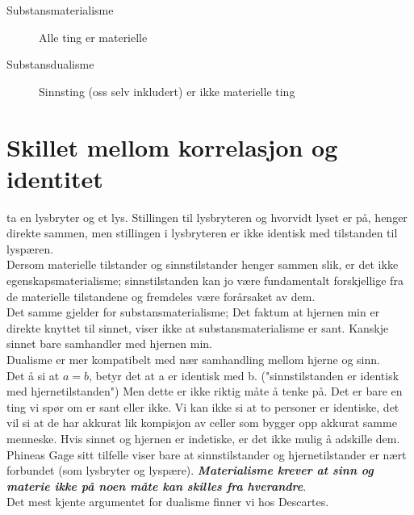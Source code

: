 \documentclass[11pt, a4paper]{article}
\begin{document}
\begin{description}
    \item[Substansmaterialisme] Alle ting er materielle
\end{description}

\begin{description}
    \item[Substansdualisme] Sinnsting (oss selv inkludert) er ikke materielle ting 
\end{description}


\section{Skillet mellom korrelasjon og identitet}

ta en lysbryter og et lys. Stillingen til lysbryteren og hvorvidt lyset er på, henger direkte sammen, men stillingen i lysbryteren er ikke identisk med tilstanden til lyspæren.\\

Dersom materielle tilstander og sinnstilstander henger sammen slik, er det ikke egenskapsmaterialisme; sinnstilstanden kan jo være fundamentalt forskjellige fra de materielle tilstandene og fremdeles være forårsaket av dem. \\

Det samme gjelder for substansmaterialisme; Det faktum at hjernen min er direkte knyttet til sinnet, viser ikke at substansmaterialisme er sant. Kanskje sinnet bare samhandler med hjernen min.\\

Dualisme er mer kompatibelt med nær samhandling mellom hjerne og sinn.\\

Det å si at $ a=b $, betyr det at a er identisk med b. ("sinnstilstanden er identisk med hjernetilstanden") Men dette er ikke riktig måte å tenke på. Det er bare en ting vi spør om er sant eller ikke. Vi kan ikke si at to personer er identiske, det vil si at de har akkurat lik kompisjon av celler som bygger opp akkurat samme menneske. Hvis sinnet og hjernen er indetiske, er det ikke mulig å adskille dem. \\

Phineas Gage sitt tilfelle viser bare at sinnstilstander og hjernetilstander er nært forbundet (som lysbryter og lyspære). \textbf{\textit{Materialisme krever at sinn og materie ikke på noen måte kan skilles fra hverandre}}.\\

Det mest kjente argumentet for dualisme finner vi hos Descartes.
\end{document}
